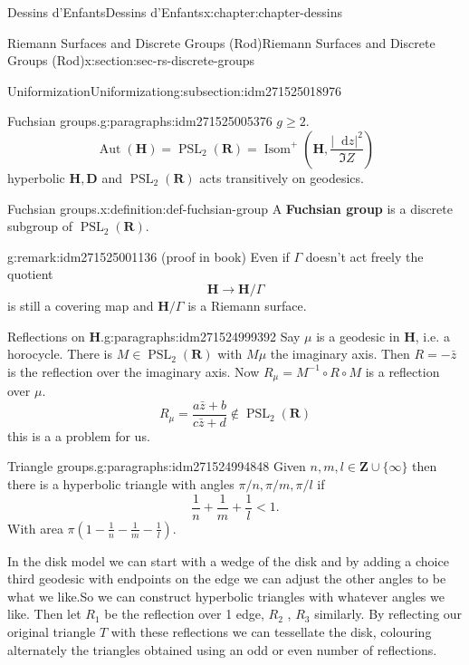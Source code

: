 \documentclass[oneside,10pt,]{book}
\newcommand{\terminology}[1]{\textbf{#1}}
\numberwithin{equation}{section}
\newcommand{\diff}{\mathop{}\!\mathrm{d}}
\newcommand{\inv}{^{-1}}
\newcommand{\ZZ}{\mathbf{Z}}
\newcommand{\RR}{\mathbf{R}}
\newcommand{\HH}{\mathbf{H}}
\DeclareMathOperator{\Aut}{Aut}
\DeclareMathOperator{\PSL}{PSL}
\newcommand{\lt}{<}
\begin{document}
\begin{chapterptx}{Dessins d'Enfants}{}{Dessins d'Enfants}{}{}{x:chapter:chapter-dessins}
\begin{sectionptx}{Riemann Surfaces and Discrete Groups (Rod)}{}{Riemann Surfaces and Discrete Groups (Rod)}{}{}{x:section:sec-rs-discrete-groups}
\begin{subsectionptx}{Uniformization}{}{Uniformization}{}{}{g:subsection:idm271525018976}
\begin{paragraphs}{Fuchsian groups.}{g:paragraphs:idm271525005376}%
\(g \ge 2\).%
\begin{equation*}
\Aut (\HH) = \PSL_2(\RR) = \operatorname{Isom}^+ ( \HH, \frac{|\diff z|^2}{\Im Z})
\end{equation*}
hyperbolic \(\HH, \mathbf D\) and \(\PSL_2(\RR)\) acts transitively on geodesics.%
\begin{definition}{Fuchsian groups.}{x:definition:def-fuchsian-group}%
A \terminology{Fuchsian group} is a discrete subgroup of \(\PSL_2(\RR)\).%
\end{definition}
\begin{remark}{}{g:remark:idm271525001136}%
(proof in book) Even if \(\Gamma\) doesn't act freely the quotient%
\begin{equation*}
\HH \to \HH/\Gamma
\end{equation*}
is still a covering map and \(\HH/\Gamma\) is a Riemann surface.%
\end{remark}
\end{paragraphs}%
\begin{paragraphs}{Reflections on \(\HH\).}{g:paragraphs:idm271524999392}%
Say \(\mu\) is a geodesic in \(\HH\), i.e. a horocycle. There is \(M \in \PSL_2(\RR)\) with \(M\mu\) the imaginary axis. Then \(R = -\bar z\) is the reflection  over the imaginary axis. Now \(R_\mu = M\inv\circ R \circ M\) is a reflection over \(\mu\).%
\begin{equation*}
R_\mu = \frac{a\bar z  + b}{ c\bar z + d}\not\in \PSL_2(\RR)
\end{equation*}
this is a a problem for us.%
\end{paragraphs}%
\begin{paragraphs}{Triangle groups.}{g:paragraphs:idm271524994848}%
Given \(n, m, l\in \ZZ \cup \{\infty\}\) then there is a hyperbolic triangle with angles \(\pi/n,\pi/m, \pi/l\) if%
\begin{equation*}
\frac 1n + \frac 1m + \frac 1l \lt 1\text{.}
\end{equation*}
With area \(\pi(1 -  \frac 1n - \frac 1m - \frac 1l)\).%
\par
In the disk model we can start with a wedge of the disk and by adding a choice third geodesic with endpoints on the edge we can adjust the other angles to be what we like.So we can construct hyperbolic triangles with whatever angles we like. Then let \(R_1\) be the reflection over 1 edge, \(R_2\) , \(R_3\) similarly. By reflecting our original triangle \(T\) with these reflections we can tessellate the disk, colouring alternately the triangles obtained using an odd or even number of reflections.%

\end{paragraphs}
\end{subsectionptx}
\end{sectionptx}
\end{chapterptx}
\end{document}
